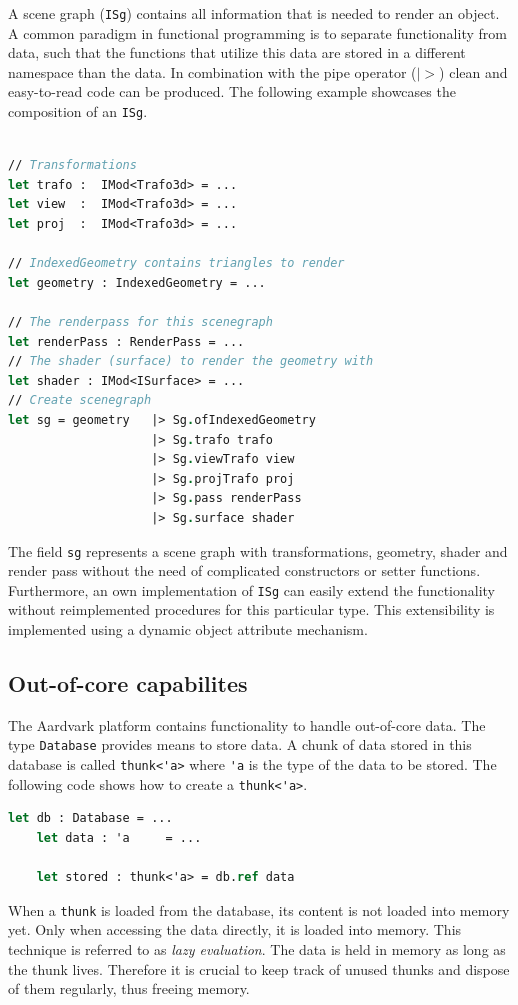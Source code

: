 A scene graph (\verb|ISg|) contains all information that is needed to render an object. A common paradigm in functional programming is to separate functionality from data, such that the functions that utilize this data are stored in a different namespace than the data. In combination with the pipe operator ($|>$) clean and easy-to-read code can be produced. The following example showcases the composition of an \verb|ISg|. 

\begin{lstlisting}[language = FSharp]

// Transformations
let trafo :  IMod<Trafo3d> = ... 
let view  :  IMod<Trafo3d> = ...
let proj  :  IMod<Trafo3d> = ...

// IndexedGeometry contains triangles to render
let geometry : IndexedGeometry = ...

// The renderpass for this scenegraph
let renderPass : RenderPass = ...
// The shader (surface) to render the geometry with
let shader : IMod<ISurface> = ...
// Create scenegraph
let sg = geometry   |> Sg.ofIndexedGeometry
                    |> Sg.trafo trafo
                    |> Sg.viewTrafo view
                    |> Sg.projTrafo proj
                    |> Sg.pass renderPass
                    |> Sg.surface shader
\end{lstlisting}

The field \verb|sg| represents a scene graph with transformations, geometry, shader and render pass without the need of complicated constructors or setter functions. Furthermore, an own implementation of \verb|ISg| can easily extend the functionality without reimplemented procedures for this particular type. This extensibility is implemented using a dynamic object attribute mechanism.


\subsection{Out-of-core capabilites}

The Aardvark platform contains functionality to handle out-of-core data. The type \verb|Database| provides means to store data. A chunk of data stored in this database is called \verb|thunk<'a>| where \verb|'a| is the type of the data to be stored. The following code shows how to create a \verb|thunk<'a>|. 

\begin{lstlisting}[language = FSharp]
    let db : Database = ...
    let data : 'a     = ...
    
    let stored : thunk<'a> = db.ref data
\end{lstlisting}
When a \verb|thunk| is loaded from the database, its content is not loaded into memory yet. Only when accessing the data directly, it is loaded into memory. This technique is referred to as \textit{lazy evaluation}. The data is held in memory as long as the thunk lives. Therefore it is crucial to keep track of unused thunks and dispose of them regularly, thus freeing memory. 


